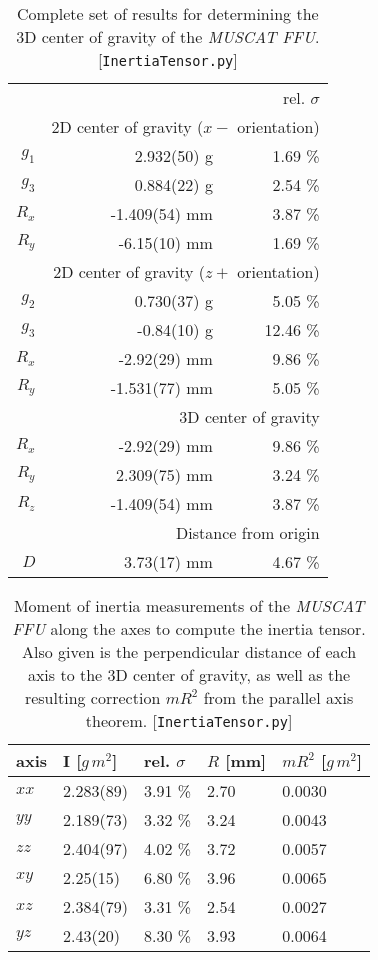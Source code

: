 \documentclass[journal]{IEEEtran}
\begin{document}
\begin{table}
	\centering
	\begin{tabular}{r | r r}
		\multicolumn{3}{r}{rel. $\sigma$} \\
		& \multicolumn{2}{r}{2D center of gravity ($x-$ orientation)} \\
		\hline
		$g_{1}$	& 2.932(50) g	& 1.69 \% \\
		$g_{3}$	& 0.884(22) g	& 2.54 \% \\
		$R_x$	& -1.409(54) mm	& 3.87 \% \\
		$R_y$	& -6.15(10) mm	& 1.69 \% \\
		& \multicolumn{2}{r}{2D center of gravity ($z+$ orientation)} \\
		\hline
		$g_2$	& 0.730(37) g	& 5.05 \% \\
		$g_3$	& -0.84(10) g	& 12.46 \% \\
		$R_x$	& -2.92(29) mm	& 9.86 \% \\
		$R_y$	& -1.531(77) mm	& 5.05 \% \\
		& \multicolumn{2}{r}{3D center of gravity} \\
		\hline
		$R_x$	& -2.92(29) mm	& 9.86 \% \\
		$R_y$	& 2.309(75) mm	& 3.24 \% \\
		$R_z$	& -1.409(54) mm	& 3.87 \% \\
		& \multicolumn{2}{r}{Distance from origin} \\
		\hline
		$D$	& 3.73(17) mm	& 4.67 \% \\
	\end{tabular}
	\caption{Complete set of results for determining the 3D center of gravity of the \emph{MUSCAT FFU}. [\texttt{InertiaTensor.py}]}
	\label{tab:FFUCoG}
\end{table}

\begin{table}
	\centering
	\begin{tabular}{l | l l l l}
		axis	& I [$\unit{g\,m^2}$]		& rel. $\sigma$ & $R$ [mm]		& $m R^2$ [$\unit{g\,m^2}$] \\
		\hline
		$xx$	& 2.283(89) & 3.91 \%	& 2.70	& 0.0030 \\
		$yy$	& 2.189(73) & 3.32 \% 	& 3.24	& 0.0043 \\
		$zz$	& 2.404(97) & 4.02 \% 	& 3.72	& 0.0057 \\
		$xy$	& 2.25(15) & 6.80 \% 	& 3.96	& 0.0065 \\
		$xz$	& 2.384(79) & 3.31 \%	& 2.54	& 0.0027 \\
		$yz$	& 2.43(20) & 8.30 \%	& 3.93	& 0.0064 \\
	\end{tabular}
	\caption{Moment of inertia measurements of the \emph{MUSCAT FFU} along the axes to compute the inertia tensor. Also given is the perpendicular distance of each axis to the 3D center of gravity, as well as the resulting correction $mR^2$ from the parallel axis theorem. [\texttt{InertiaTensor.py}]}
	\label{tab:FFUI}
\end{table}
\end{document}
